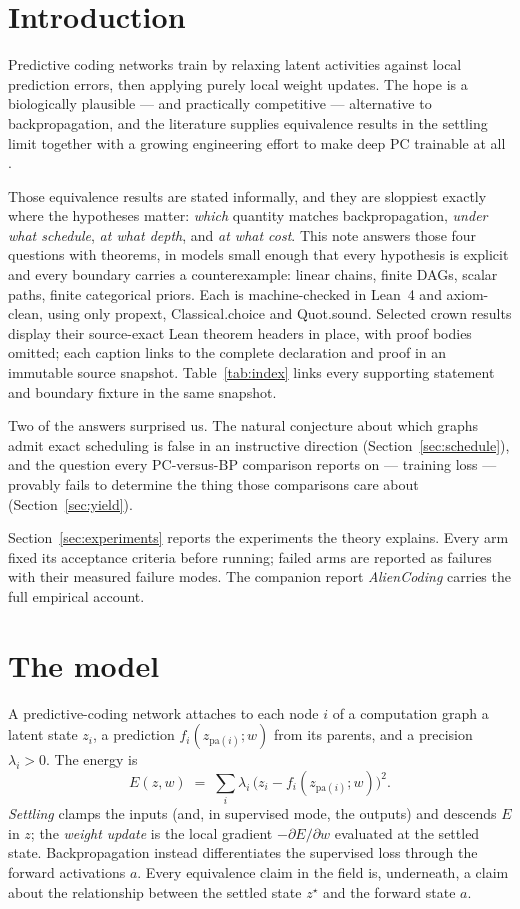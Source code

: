 \documentclass[11pt]{article}
\newcommand{\leanname}[1]{{\scriptsize\ttfamily
  \def\_{\textunderscore\allowbreak}#1}}
\begin{document}
\section{Introduction}

Predictive coding networks train by relaxing latent activities against local prediction
errors, then applying purely local weight updates. The hope is a biologically plausible
--- and practically competitive --- alternative to backpropagation, and the literature
supplies equivalence results in the settling limit together with a growing engineering
effort to make deep PC trainable at all
\cite{whittington2017,song2020,millidge2020,salvatori2022,goemaere2025}.

Those equivalence results are stated informally, and they are sloppiest exactly where
the hypotheses matter: \emph{which} quantity matches backpropagation, \emph{under what
schedule}, \emph{at what depth}, and \emph{at what cost}. This note answers those four
questions with theorems, in models small enough that every hypothesis is explicit and
every boundary carries a counterexample: linear chains, finite DAGs, scalar paths,
finite categorical priors. Each is machine-checked in Lean~4 and axiom-clean, using only
\leanname{propext}, \leanname{Classical.choice} and \leanname{Quot.sound}. Selected
crown results display their source-exact Lean theorem headers in place, with proof
bodies omitted; each caption links to the complete declaration and proof in an
immutable source snapshot. Table~\ref{tab:index} links every supporting statement and
boundary fixture in the same snapshot.

Two of the answers surprised us. The natural conjecture about which graphs admit exact
scheduling is false in an instructive direction (Section~\ref{sec:schedule}), and the
question every PC-versus-BP comparison reports on --- training loss --- provably fails
to determine the thing those comparisons care about (Section~\ref{sec:yield}).

Section~\ref{sec:experiments} reports the experiments the theory explains. Every arm
fixed its acceptance criteria before running; failed arms are reported as failures with
their measured failure modes. The companion report \emph{AlienCoding} carries the full
empirical account.

\section{The model}

A predictive-coding network attaches to each node $i$ of a computation graph a latent
state $z_i$, a prediction $f_i(z_{\mathrm{pa}(i)};w)$ from its parents, and a precision
$\lambda_i > 0$. The energy is
\[
E(z,w) \;=\; \sum_i \lambda_i\,\bigl(z_i - f_i(z_{\mathrm{pa}(i)};w)\bigr)^2 .
\]
\emph{Settling} clamps the inputs (and, in supervised mode, the outputs) and descends
$E$ in $z$; the \emph{weight update} is the local gradient $-\partial E/\partial w$
evaluated at the settled state. Backpropagation instead differentiates the supervised
loss through the forward activations $a$. Every equivalence claim in the field is,
underneath, a claim about the relationship between the settled state $z^\star$ and the
forward state $a$.
\end{document}
